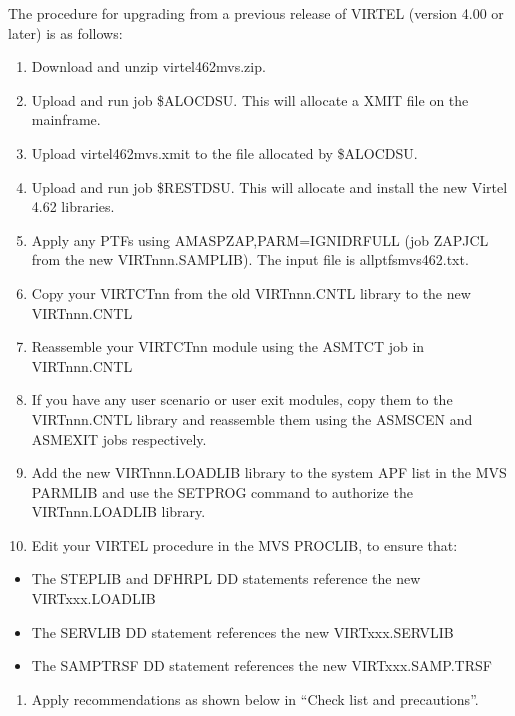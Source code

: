 \documentclass[letterpaper,10pt,english]{sphinxmanual}
\begin{document}
\sphinxAtStartPar
The procedure for upgrading from a previous release of VIRTEL (version 4.00 or later) is as follows:
\begin{enumerate}
%
\item {} 
\sphinxAtStartPar
Download and unzip virtel462mvs.zip.

\item {} 
\sphinxAtStartPar
Upload and run job \$ALOCDSU. This will allocate a XMIT file on the mainframe.

\item {} 
\sphinxAtStartPar
Upload virtel462mvs.xmit to the file allocated by \$ALOCDSU.

\item {} 
\sphinxAtStartPar
Upload and run job \$RESTDSU. This will allocate and install the new Virtel 4.62 libraries.

\item {} 
\sphinxAtStartPar
Apply any PTFs using AMASPZAP,PARM=IGNIDRFULL (job ZAPJCL from the new VIRTnnn.SAMPLIB). The input file is allptfs\sphinxhyphen{}mvs462.txt.

\item {} 
\sphinxAtStartPar
Copy your VIRTCTnn from the old VIRTnnn.CNTL library to the new VIRTnnn.CNTL

\item {} 
\sphinxAtStartPar
Reassemble your VIRTCTnn module using the ASMTCT job in VIRTnnn.CNTL

\item {} 
\sphinxAtStartPar
If you have any user scenario or user exit modules, copy them to the VIRTnnn.CNTL library and reassemble them using the ASMSCEN and ASMEXIT jobs respectively.

\item {} 
\sphinxAtStartPar
Add the new VIRTnnn.LOADLIB library to the system APF list in the MVS PARMLIB and use the SETPROG command to authorize the VIRTnnn.LOADLIB library.

\item {} 
\sphinxAtStartPar
Edit your VIRTEL procedure in the MVS PROCLIB, to ensure that:

\end{enumerate}
\begin{itemize}
\item {} 
\sphinxAtStartPar
The STEPLIB and DFHRPL DD statements reference the new VIRTxxx.LOADLIB

\item {} 
\sphinxAtStartPar
The SERVLIB DD statement references the new VIRTxxx.SERVLIB

\item {} 
\sphinxAtStartPar
The SAMPTRSF DD statement references the new VIRTxxx.SAMP.TRSF

\end{itemize}
\begin{enumerate}
%
\setcounter{enumi}{10}
\item {} 
\sphinxAtStartPar
Apply recommendations as shown below in “Check list and precautions”.

\end{enumerate}
\end{document}

